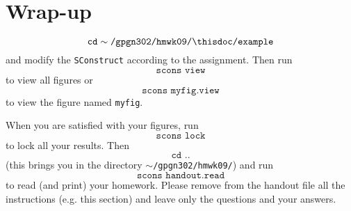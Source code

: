\def\basedir{psava/gpgn302}

\section{Wrap-up}

\[ \texttt{cd} \sim\texttt{/gpgn302/hmwk09/\thisdoc/example} \]
and modify the \texttt{SConstruct} according to the assignment. Then
run 
\[ \texttt{scons view} \]
 to view all figures or 
\[ \texttt{scons myfig.view} \]
to view the figure named \texttt{myfig}.

When you are satisfied with your figures, run 
\[ \texttt{scons lock} \]
to lock all your results. Then 
\[ \texttt{cd ..} \]
 (this brings you in the directory
\texttt{$\sim$/gpgn302/hmwk09/\thisdoc}) and run
\[ \texttt{scons handout.read} \]
to read (and print) your homework. Please remove from the handout file
all the instructions (e.g. this section) and leave only the questions
and your answers.
